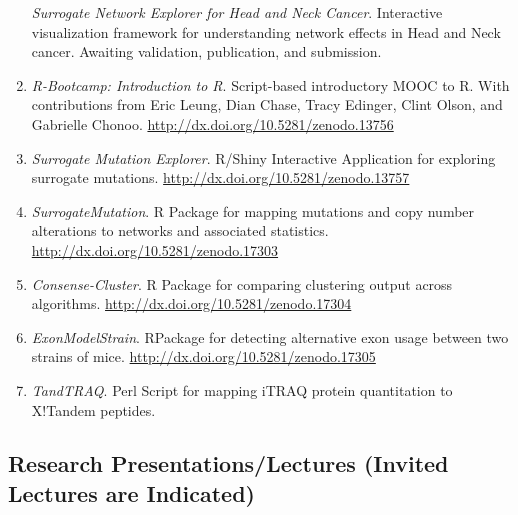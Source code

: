 \documentclass[11pt,]{article}
\begin{document}
\begin{enumerate}
  \emph{Surrogate Network Explorer for Head and Neck Cancer}.
  Interactive visualization framework for understanding network effects
  in Head and Neck cancer. Awaiting validation, publication, and
  submission.
\item
  \emph{R-Bootcamp: Introduction to R}. Script-based introductory MOOC
  to R. With contributions from Eric Leung, Dian Chase, Tracy Edinger,
  Clint Olson, and Gabrielle Chonoo.
  \url{http://dx.doi.org/10.5281/zenodo.13756}
\item
  \emph{Surrogate Mutation Explorer}. R/Shiny Interactive Application
  for exploring surrogate mutations.
  \url{http://dx.doi.org/10.5281/zenodo.13757}
\item
  \emph{SurrogateMutation}. R Package for mapping mutations and copy
  number alterations to networks and associated statistics.
  \url{http://dx.doi.org/10.5281/zenodo.17303}
\item
  \emph{Consense-Cluster}. R Package for comparing clustering output
  across algorithms. \url{http://dx.doi.org/10.5281/zenodo.17304}
\item
  \emph{ExonModelStrain}. RPackage for detecting alternative exon usage
  between two strains of mice.
  \url{http://dx.doi.org/10.5281/zenodo.17305}
\item
  \emph{TandTRAQ}. Perl Script for mapping iTRAQ protein quantitation to
  X!Tandem peptides.
\end{enumerate}

\subsection{Research Presentations/Lectures (Invited Lectures are
Indicated)}\label{research-presentationslectures-invited-lectures-are-indicated}
\end{document}
